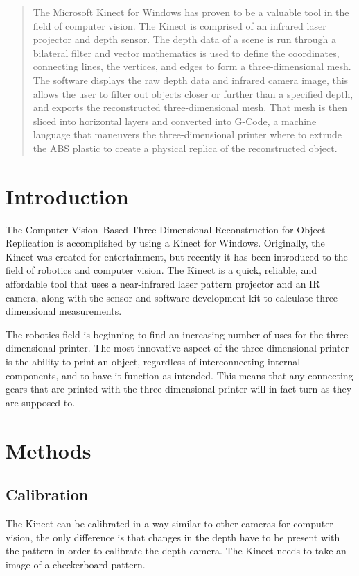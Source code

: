 \documentclass[pdftex,10.5pt]{report}
\begin{document}


\begin{abstract}
The Microsoft Kinect for Windows has proven to be a valuable tool in the field of computer vision. The Kinect is comprised of an infrared laser projector and depth sensor. The depth data of a scene is run through a bilateral filter and vector mathematics is used to define the coordinates, connecting lines, the vertices, and edges to form a three-dimensional mesh. The software displays the raw depth data and infrared camera image, this allows the user to filter out objects closer or further than a specified depth, and exports the reconstructed three-dimensional mesh. That mesh is then sliced into horizontal layers and converted into G-Code, a machine language that maneuvers the three-dimensional printer where to extrude the ABS plastic to create a physical replica of the reconstructed object. 
\end{abstract}
\tableofcontents



\section{Introduction}
The Computer Vision--Based Three-Dimensional Reconstruction for Object Replication is accomplished by using a Kinect for Windows. Originally, the Kinect was created for entertainment, but recently it has been introduced to the field of robotics and computer vision. The Kinect is a quick, reliable, and affordable tool that uses a near-infrared laser pattern projector and an IR camera, along with the sensor and software development kit to calculate three-dimensional measurements.

The robotics field is beginning to find an increasing number of uses for the three-dimensional printer. The most innovative aspect of the three-dimensional printer is the ability to print an object, regardless of interconnecting internal components, and to have it function as intended. This means that any connecting gears that are printed with the three-dimensional printer will in fact turn as they are supposed to.

\section{Methods}
\subsection{Calibration}
The Kinect can be calibrated in a way similar to other cameras for computer vision, the only difference is that changes in the depth have to be present  with the pattern in order to calibrate the depth camera. The Kinect needs to take an image of a checkerboard pattern.
\end{document}
